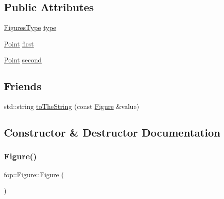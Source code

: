\subsection*{Public Attributes}
\begin{DoxyCompactItemize}
\item 
\mbox{\hyperlink{namespacefop_a60dafe2e1ac5bb402dad57ecacde23d5}{Figures\+Type}} \mbox{\hyperlink{classfop_1_1_figure_ab3800215a1229d637bae3c24cfc59e08}{type}}
\item 
\mbox{\hyperlink{structtdp_1_1_point}{Point}} \mbox{\hyperlink{classfop_1_1_figure_afac8422d33b66489e3a7ddda4751d219}{first}}
\item 
\mbox{\hyperlink{structtdp_1_1_point}{Point}} \mbox{\hyperlink{classfop_1_1_figure_a10aa53d6dcfa427b06ebcf93ae6075b9}{second}}
\end{DoxyCompactItemize}
\subsection*{Friends}
\begin{DoxyCompactItemize}
\item 
std\+::string \mbox{\hyperlink{classfop_1_1_figure_a64f76b9a0cc2e1c8d1f1a8a025e76078}{to\+The\+String}} (const \mbox{\hyperlink{classfop_1_1_figure}{Figure}} \&value)
\end{DoxyCompactItemize}


\subsection{Constructor \& Destructor Documentation}
\mbox{\label{classfop_1_1_figure_a624b2de787892723cbc48e67e847a2d6}} 
\subsubsection{\texorpdfstring{Figure()}{Figure()}\hspace{0.1cm}{\footnotesize\ttfamily [1/4]}}
{\footnotesize\ttfamily fop\+::\+Figure\+::\+Figure (\begin{DoxyParamCaption}{ }\end{DoxyParamCaption})}

\mbox{\label{classfop_1_1_figure_af2154691492fa9cc825c7b4fc3224567}} 
